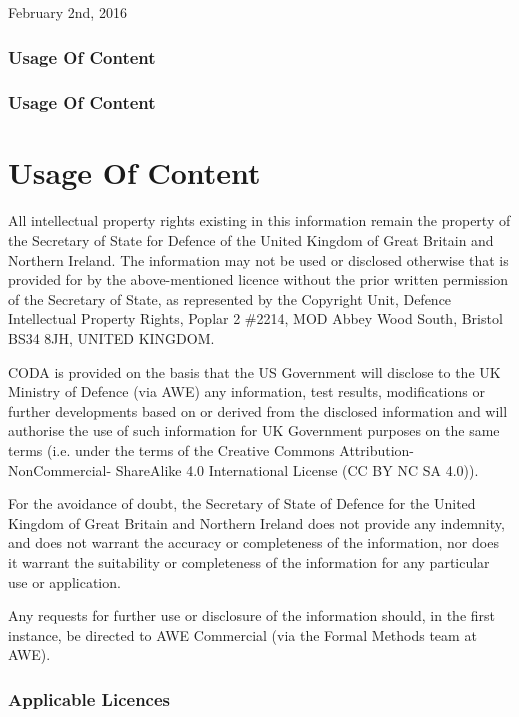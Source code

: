 February 2nd, 2016

\ifplastex
\subsubsection{Usage Of Content}
\label{sec:usage-content}
\else
  \ifstandalone
  \subsubsection{Usage Of Content}
  \label{sec:usage-content}
  \else
  \section{Usage Of Content}
  \label{sec:usage-content}
  \fi
\fi

All intellectual property rights existing in this information remain
the property of the Secretary of State for Defence of the United
Kingdom of Great Britain and Northern Ireland. The information may not
be used or disclosed otherwise that is provided for by the
above-mentioned licence without the prior written permission of the
Secretary of State, as represented by the Copyright Unit, Defence
Intellectual Property Rights, Poplar 2 \#2214, MOD Abbey Wood South,
Bristol BS34 8JH, UNITED KINGDOM.

CODA is provided on the basis that the US Government will disclose to
the UK Ministry of Defence (via AWE) any information, test results,
modifications or further developments based on or derived from the
disclosed information and will authorise the use of such information
for UK Government purposes on the same terms (i.e. under the terms of
the Creative Commons Attribution-NonCommercial- ShareAlike 4.0
International License (CC BY NC SA 4.0)).

For the avoidance of doubt, the Secretary of State of Defence for the
United Kingdom of Great Britain and Northern Ireland does not provide
any indemnity, and does not warrant the accuracy or completeness of
the information, nor does it warrant the suitability or completeness
of the information for any particular use or application.

Any requests for further use or disclosure of the information should,
in the first instance, be directed to AWE Commercial (via the Formal
Methods team at AWE).

\ifplastex
\subsubsection{Applicable Licences}
\label{sec:vhdl-applicable-licences}
\else
  \ifstandalone
